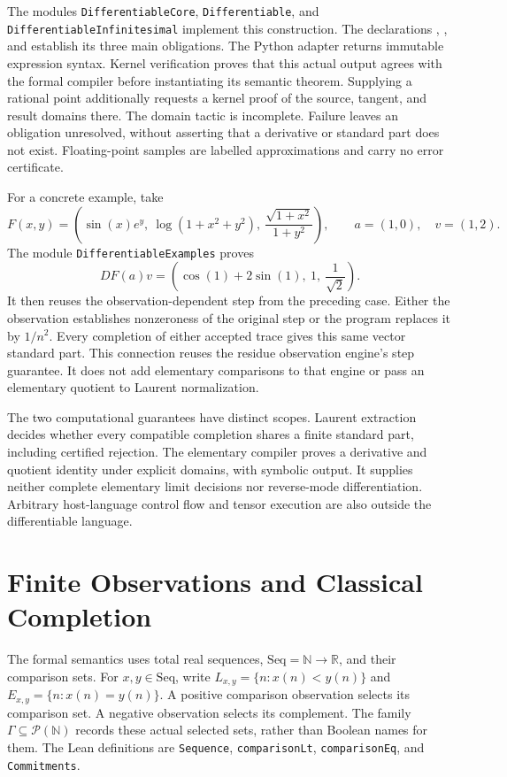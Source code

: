 \documentclass[11pt,a4paper]{article}
\theoremstyle{result}
\theoremstyle{definition}
\newcommand{\N}{\mathbb{N}}
\newcommand{\R}{\mathbb{R}}
\newcommand{\code}[1]{\texttt{#1}}
\begin{document}
The modules \code{DifferentiableCore}, \code{Differentiable}, and \code{DifferentiableInfinitesimal} implement this construction. The declarations , , and  establish its three main obligations. The Python adapter returns immutable expression syntax. Kernel verification proves that this actual output agrees with the formal compiler before instantiating its semantic theorem. Supplying a rational point additionally requests a kernel proof of the source, tangent, and result domains there. The domain tactic is incomplete. Failure leaves an obligation unresolved, without asserting that a derivative or standard part does not exist. Floating-point samples are labelled approximations and carry no error certificate.

For a concrete example, take
\[
  F(x,y)=\left(\sin(x)e^y,\ \log(1+x^2+y^2),\
    \frac{\sqrt{1+x^2}}{1+y^2}\right),\qquad a=(1,0),\quad v=(1,2).
\]
The module \code{DifferentiableExamples} proves
\[
  DF(a)v=\left(\cos(1)+2\sin(1),\ 1,\ \frac{1}{\sqrt2}\right).
\]
It then reuses the observation-dependent step from the preceding case. Either the observation establishes nonzeroness of the original step or the program replaces it by $1/n^2$. Every completion of either accepted trace gives this same vector standard part. This connection reuses the residue observation engine's step guarantee. It does not add elementary comparisons to that engine or pass an elementary quotient to Laurent normalization.

The two computational guarantees have distinct scopes. Laurent extraction decides whether every compatible completion shares a finite standard part, including certified rejection. The elementary compiler proves a derivative and quotient identity under explicit domains, with symbolic output. It supplies neither complete elementary limit decisions nor reverse-mode differentiation. Arbitrary host-language control flow and tensor execution are also outside the differentiable language.

\section{Finite Observations and Classical Completion}\label{sec:background}

The formal semantics uses total real sequences, $\mathrm{Seq}=\N\to\R$, and their comparison sets. For $x,y\in\mathrm{Seq}$, write $L_{x,y}=\{n:x(n)<y(n)\}$ and $E_{x,y}=\{n:x(n)=y(n)\}$. A positive comparison observation selects its comparison set. A negative observation selects its complement. The family $\Gamma\subseteq\mathcal P(\N)$ records these actual selected sets, rather than Boolean names for them. The Lean definitions are \code{Sequence}, \code{comparisonLt}, \code{comparisonEq}, and \code{Commitments}.
\end{document}
